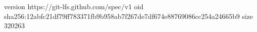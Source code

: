version https://git-lfs.github.com/spec/v1
oid sha256:12abfc21df79ff783371fb9b958ab7f267de7df674e88769086cc254a24665b9
size 320263
